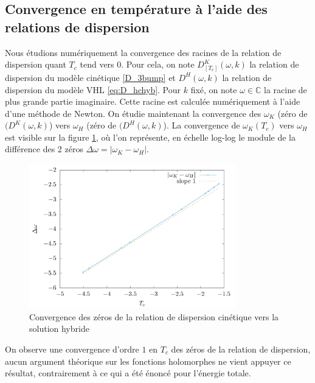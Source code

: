 \subsection{Convergence en température à l'aide des relations de dispersion}

Nous \'etudions num\'eriquement la convergence des racines de la relation de dispersion quant $T_c$ tend vers $0$. 
Pour cela, on note $D^K_{[T_c]}(\omega,k)$ la relation de dispersion du mod\`ele cin\'etique \eqref{D_3bump} 
et $D^H(\omega,k)$ la relation de dispersion du mod\`ele VHL \eqref{eq:D_hchyb}.  
Pour $k$ fix\'e, on note $\omega\in\mathbb{C}$ la racine de plus grande partie imaginaire. 
Cette racine est calcul\'ee num\'eriquement \`a l'aide d'une m\'ethode de Newton. On étudie maintenant la convergence  
des $\omega_K$ (zéro de $(D^K(\omega,k)$) vers $\omega_H$ (zéro de $(D^H(\omega,k)$). La convergence de $\omega_K(T_c)$ vers $\omega_H$ est visible sur la figure \ref{fig:omega}, où l'on représente, en échelle log-log le module de la différence des 2 zéros $\Delta \omega = |\omega_K-\omega_H|$.
\begin{figure}[h!]
  \centering
  \includegraphics[width=0.8\textwidth]{img/omega.png}
  \caption{Convergence des zéros de la relation de dispersion cinétique vers la solution hybride}
  \label{fig:omega}
\end{figure}
On observe une convergence d'ordre $1$ en $T_c$ des zéros de la relation de dispersion, aucun argument théorique sur les fonctions holomorphes ne vient appuyer ce résultat, contrairement à ce qui a été énoncé pour l'énergie totale.

